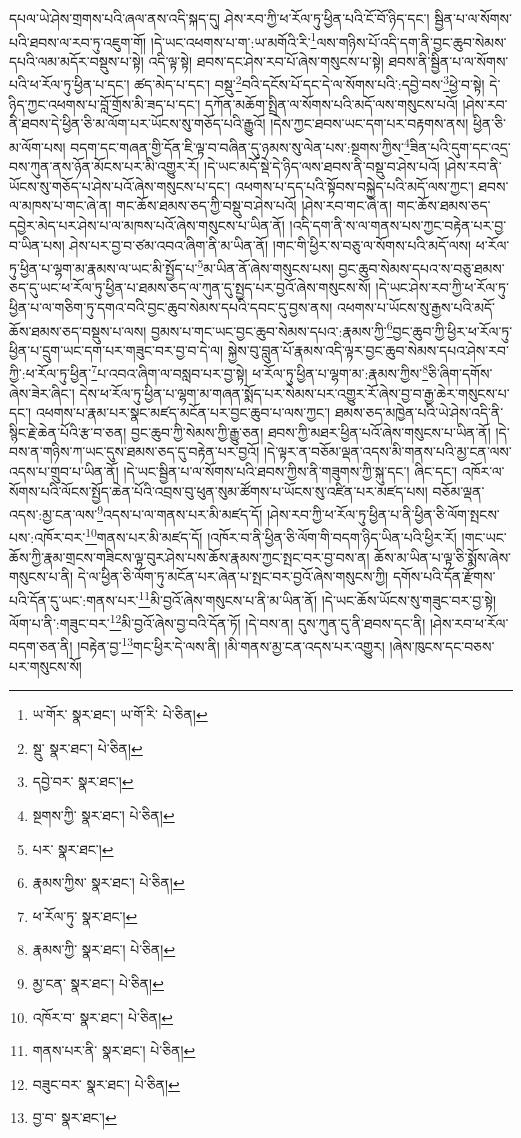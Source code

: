 དཔལ་ཡེ་ཤེས་གྲགས་པའི་ཞལ་ནས་འདི་སྐད་དུ། ཤེས་རབ་ཀྱི་ཕ་རོལ་ཏུ་ཕྱིན་པའི་ངོ་བོ་ཉིད་དང་། སྦྱིན་པ་ལ་སོགས་པའི་ཐབས་ལ་རབ་ཏུ་འཇུག་གོ། །དེ་ཡང་འཕགས་པ་ག་:ཡ་མགོའི་རི་\footnote{ཡ་གོར་  སྣར་ཐང་། ཡ་གོ་རི་  པེ་ཅིན། }ལས་གཉིས་པོ་འདི་དག་ནི་བྱང་ཆུབ་སེམས་དཔའི་ལམ་མདོར་བསྡུས་པ་སྟེ། འདི་ལྟ་སྟེ། ཐབས་དང་ཤེས་རབ་པོ་ཞེས་གསུངས་པ་སྟེ། ཐབས་ནི་སྦྱིན་པ་ལ་སོགས་པའི་ཕ་རོལ་ཏུ་ཕྱིན་པ་དང་། ཚད་མེད་པ་དང་། བསྡུ་\footnote{སྡུ་  སྣར་ཐང་།  པེ་ཅིན། }བའི་དངོས་པོ་དང་དེ་ལ་སོགས་པའི་:དབྱེ་བས་\footnote{དབྱེ་བར་  སྣར་ཐང་། }ཕྱེ་བ་སྟེ། དེ་ཉིད་ཀྱང་འཕགས་པ་བློ་གྲོས་མི་ཟད་པ་དང་། དཀོན་མཆོག་སྤྲིན་ལ་སོགས་པའི་མདོ་ལས་གསུངས་པའོ། །ཤེས་རབ་ནི་ཐབས་དེ་ཕྱིན་ཅི་མ་ལོག་པར་ཡོངས་སུ་གཅོད་པའི་རྒྱུའོ། །དེས་ཀྱང་ཐབས་ཡང་དག་པར་བརྟགས་ནས། ཕྱིན་ཅི་མ་ལོག་པས། བདག་དང་གཞན་གྱི་དོན་ཇི་ལྟ་བ་བཞིན་དུ་ཉམས་སུ་ལེན་པས་:སྔགས་ཀྱིས་\footnote{སྔགས་ཀྱི་  སྣར་ཐང་།  པེ་ཅིན། }ཟིན་པའི་དུག་དང་འདྲ་བས་ཀུན་ནས་ཉོན་མོངས་པར་མི་འགྱུར་རོ། །དེ་ཡང་མདོ་སྡེ་དེ་ཉིད་ལས་ཐབས་ནི་བསྡུ་བ་ཤེས་པའོ། །ཤེས་རབ་ནི་ཡོངས་སུ་གཅོད་པ་ཤེས་པའོ་ཞེས་གསུངས་པ་དང་། འཕགས་པ་དད་པའི་སྟོབས་བསྐྱེད་པའི་མདོ་ལས་ཀྱང་། ཐབས་ལ་མཁས་པ་གང་ཞེ་ན། གང་ཆོས་ཐམས་ཅད་ཀྱི་བསྡུ་བ་ཤེས་པའོ། །ཤེས་རབ་གང་ཞེ་ན། གང་ཆོས་ཐམས་ཅད་དབྱེར་མེད་པར་ཤེས་པ་ལ་མཁས་པའོ་ཞེས་གསུངས་པ་ཡིན་ནོ། །འདི་དག་ནི་ས་ལ་གནས་པས་ཀྱང་བརྟེན་པར་བྱ་བ་ཡིན་པས། ཤེས་པར་བྱ་བ་ཙམ་འབའ་ཞིག་ནི་མ་ཡིན་ནོ། །གང་གི་ཕྱིར་ས་བཅུ་ལ་སོགས་པའི་མདོ་ལས། ཕ་རོལ་ཏུ་ཕྱིན་པ་ལྷག་མ་རྣམས་ལ་ཡང་མི་སྤྱོད་པ་\footnote{པར་  སྣར་ཐང་། }མ་ཡིན་ནོ་ཞེས་གསུངས་པས། བྱང་ཆུབ་སེམས་དཔའ་ས་བཅུ་ཐམས་ཅད་དུ་ཡང་ཕ་རོལ་ཏུ་ཕྱིན་པ་ཐམས་ཅད་ལ་ཀུན་དུ་སྤྱད་པར་བྱའོ་ཞེས་གསུངས་སོ། །དེ་ཡང་ཤེས་རབ་ཀྱི་ཕ་རོལ་ཏུ་ཕྱིན་པ་ལ་གཅིག་ཏུ་དགའ་བའི་བྱང་ཆུབ་སེམས་དཔའི་དབང་དུ་བྱས་ནས། འཕགས་པ་ཡོངས་སུ་རྒྱས་པའི་མདོ་ཆོས་ཐམས་ཅད་བསྡུས་པ་ལས། བྱམས་པ་གང་ཡང་བྱང་ཆུབ་སེམས་དཔའ་:རྣམས་ཀྱི་\footnote{རྣམས་ཀྱིས་  སྣར་ཐང་།  པེ་ཅིན། }བྱང་ཆུབ་ཀྱི་ཕྱིར་ཕ་རོལ་ཏུ་ཕྱིན་པ་དྲུག་ཡང་དག་པར་གཟུང་བར་བྱ་བ་དེ་ལ། སྐྱེས་བུ་བླུན་པོ་རྣམས་འདི་ལྟར་བྱང་ཆུབ་སེམས་དཔའ་ཤེས་རབ་ཀྱི་:ཕ་རོལ་ཏུ་ཕྱིན་\footnote{ཕ་རོལ་ཏུ་  སྣར་ཐང་། }པ་འབའ་ཞིག་ལ་བསླབ་པར་བྱ་སྟེ། ཕ་རོལ་ཏུ་ཕྱིན་པ་ལྷག་མ་:རྣམས་ཀྱིས་\footnote{རྣམས་ཀྱི་  སྣར་ཐང་།  པེ་ཅིན། }ཅི་ཞིག་དགོས་ཞེས་ཟེར་ཞིང་། དེས་ཕ་རོལ་ཏུ་ཕྱིན་པ་ལྷག་མ་གཞན་སྨོད་པར་སེམས་པར་འགྱུར་རོ་ཞེས་བྱ་བ་རྒྱ་ཆེར་གསུངས་པ་དང་། འཕགས་པ་རྣམ་པར་སྣང་མཛད་མངོན་པར་བྱང་ཆུབ་པ་ལས་ཀྱང་། ཐམས་ཅད་མཁྱེན་པའི་ཡེ་ཤེས་འདི་ནི་སྙིང་རྗེ་ཆེན་པོའི་རྩ་བ་ཅན། བྱང་ཆུབ་ཀྱི་སེམས་ཀྱི་རྒྱུ་ཅན། ཐབས་ཀྱི་མཐར་ཕྱིན་པའོ་ཞེས་གསུངས་པ་ཡིན་ནོ། །དེ་བས་ན་གཉིས་ཀ་ཡང་དུས་ཐམས་ཅད་དུ་བརྟེན་པར་བྱའོ། །དེ་ལྟར་ན་བཅོམ་ལྡན་འདས་མི་གནས་པའི་མྱ་ངན་ལས་འདས་པ་གྲུབ་པ་ཡིན་ནོ། །དེ་ཡང་སྦྱིན་པ་ལ་སོགས་པའི་ཐབས་ཀྱིས་ནི་གཟུགས་ཀྱི་སྐུ་དང་། ཞིང་དང་། འཁོར་ལ་སོགས་པའི་ལོངས་སྤྱོད་ཆེན་པོའི་འབྲས་བུ་ཕུན་སུམ་ཚོགས་པ་ཡོངས་སུ་འཛིན་པར་མཛད་པས། བཅོམ་ལྡན་འདས་:མྱ་ངན་ལས་\footnote{མྱ་ངན་  སྣར་ཐང་།  པེ་ཅིན། }འདས་པ་ལ་གནས་པར་མི་མཛད་དོ། །ཤེས་རབ་ཀྱི་ཕ་རོལ་ཏུ་ཕྱིན་པ་ནི་ཕྱིན་ཅི་ལོག་སྤངས་པས་:འཁོར་བར་\footnote{འཁོར་བ་  སྣར་ཐང་།  པེ་ཅིན། }གནས་པར་མི་མཛད་དོ། །འཁོར་བ་ནི་ཕྱིན་ཅི་ལོག་གི་བདག་ཉིད་ཡིན་པའི་ཕྱིར་རོ། །གང་ཡང་ཆོས་ཀྱི་རྣམ་གྲངས་གཟིངས་ལྟ་བུར་ཤེས་པས་ཆོས་རྣམས་ཀྱང་སྤང་བར་བྱ་བས་ན། ཆོས་མ་ཡིན་པ་ལྟ་ཅི་སྨོས་ཞེས་གསུངས་པ་ནི། དེ་ལ་ཕྱིན་ཅི་ལོག་ཏུ་མངོན་པར་ཞེན་པ་སྤང་བར་བྱའོ་ཞེས་གསུངས་ཀྱི། དགོས་པའི་དོན་རྫོགས་པའི་དོན་དུ་ཡང་:གནས་པར་\footnote{གནས་པར་ནི་  སྣར་ཐང་།  པེ་ཅིན། }མི་བྱའོ་ཞེས་གསུངས་པ་ནི་མ་ཡིན་ནོ། །དེ་ཡང་ཆོས་ཡོངས་སུ་གཟུང་བར་བྱ་སྟེ། ལོག་པ་ནི་:གཟུང་བར་\footnote{བཟུང་བར་  སྣར་ཐང་།  པེ་ཅིན། }མི་བྱའོ་ཞེས་བྱ་བའི་དོན་ཏོ། །དེ་བས་ན། དུས་ཀུན་དུ་ནི་ཐབས་དང་ནི། །ཤེས་རབ་ཕ་རོལ་བདག་ཅན་ནི། །བརྟེན་བྱ་\footnote{བྱ་བ་  སྣར་ཐང་། }གང་ཕྱིར་དེ་ལས་ནི། །མི་གནས་མྱ་ངན་འདས་པར་འགྱུར། །ཞེས་ཁུངས་དང་བཅས་པར་གསུངས་སོ། 